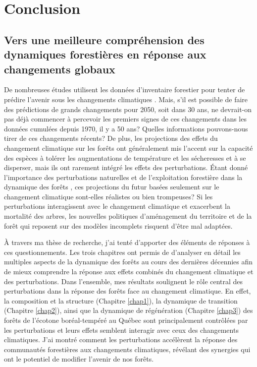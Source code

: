 \francais

\chapter*{Conclusion}

\hypertarget{vers-une-meilleure-compruxe9hension-des-dynamiques-forestiuxe8res-en-ruxe9ponse-aux-changements-globaux}{%
\section{Vers une meilleure compréhension des dynamiques forestières en
réponse aux changements
globaux}\label{vers-une-meilleure-compruxe9hension-des-dynamiques-forestiuxe8res-en-ruxe9ponse-aux-changements-globaux}}

De nombreuses études utilisent les données d'inventaire forestier pour
tenter de prédire l'avenir sous les changements climatiques
\citep{boulanger_climate_2017, perie_dominant_2016, vissault_biogeographie_2016, meier_climate_2012, iverson_estimating_2008, chen_modeling_2002}.
Mais, s'il est possible de faire des prédictions de grands changements
pour 2050, soit dans 30 ans, ne devrait-on pas déjà commencer à
percevoir les premiers signes de ces changements dans les données
cumulées depuis 1970, il y a 50 ans? Quelles informations pouvons-nous
tirer de ces changements récents? De plus, les projections des effets du
changement climatique sur les forêts ont généralement mis l'accent sur
la capacité des espèces à tolérer les augmentations de température et
les sécheresses et à se disperser, mais ils ont rarement intégré les
effets des perturbations. Étant donné l'importance des perturbations
naturelles et de l'exploitation forestière dans la dynamique des forêts
\citep{turner_disturbance_2010}, ces projections du futur basées
seulement sur le changement climatique sont-elles réalistes ou bien
trompeuses? Si les perturbations interagissent avec le changement
climatique et exacerbent la mortalité des arbres, les nouvelles
politiques d'aménagement du territoire et de la forêt qui reposent sur
des modèles incomplets risquent d'être mal adaptées.

À travers ma thèse de recherche, j'ai tenté d'apporter des éléments de
réponses à ces questionnements. Les trois chapitres ont permis de
d'analyser en détail les multiples aspects de la dynamique des forêts au
cours des dernières décennies afin de mieux comprendre la réponse aux
effets combinés du changement climatique et des perturbations. Dans
l'ensemble, mes résultats soulignent le rôle central des perturbations
dans la réponse des forêts face au changement climatique. En effet, la
composition et la structure (Chapitre \ref{chap1}), la dynamique de
transition (Chapitre \ref{chap2}), ainsi que la dynamique de
régénération (Chapitre \ref{chap3}) des forêts de l'écotone
boréal-tempéré au Québec sont principalement contrôlées par les
perturbations et leurs effets semblent interagir avec ceux des
changements climatiques. J'ai montré comment les perturbations
accélèrent la réponse des communautés forestières aux changements
climatiques, révélant des synergies qui ont le potentiel de modifier
l'avenir de nos forêts.

